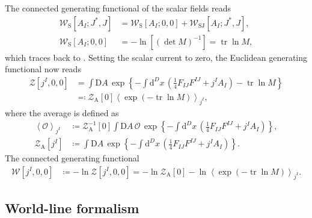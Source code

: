 \documentclass[12pt]{article}
\newcommand\dif{\mathrm{d}}
\newcommand\Dif{\mathrm{D}}
\DeclareMathOperator{\tr}{tr}
\newcommand{\rbr}[1]{{\left(#1\right)}}
\newcommand{\abr}[1]{{\left<#1\right>}}
\newcommand{\rfun}[2]{{#1}\mathopen{}\left(#2\right)\mathclose{}}
\newcommand{\sfun}[2]{{#1}\mathopen{}\left[#2\right]\mathclose{}}
\newcommand{\cfun}[2]{{#1}\mathopen{}\left\{#2\right\}\mathclose{}}
\begin{document}
The connected generating functional of the scalar fields reads
\begin{align}
\sfun{\mathcal{W}_{\text{S}}}{A_I; J^*, J} &= 
	\sfun{\mathcal{W}_{\text{S}}}{A_I; 0,0} +
	\sfun{\mathcal{W}_\text{SJ}}{A_I; J^*, J},
\\
\sfun{\mathcal{W}_{\text{S}}}{A_I; 0,0} &=
	-\sfun{\ln}{\rbr{\det M}^{-1}} = \tr\ln M,
\end{align}
which traces back to \cite{heisenberg1936,weisskopf1936}. Setting the scalar 
current to zero, the Euclidean generating functional now reads
\begin{align}
\sfun{\mathcal{Z}}{j^I, 0, 0} &=
\int\Dif A\, \cfun{\exp}{-\int \dif^D x\,
\rbr{\frac{1}{4} F_{IJ} F^{IJ} + j^{I} A_{I}} - \tr\ln M}
\nonumber \\
&\eqqcolon
\sfun{\mathcal{Z}_\text{A}}{0}
		\abr{\rfun{\exp}{-\tr\ln M}}_{j^I},
\label{eq:eucl-effe-100}
\end{align}
where the average is defined as
\begin{align}
\abr{\mathcal{O}}_{j^I} &\coloneqq \sfun{\mathcal{Z}_\text{A}^{-1}}{0}
\int\Dif A\, \mathcal{O}\,\cfun{\exp}{-\int \dif^D x\,
	\rbr{\frac{1}{4} F_{IJ} F^{IJ} + j^{I} A_{I}}},
\\
\sfun{\mathcal{Z}_\text{A}}{j^I} &\coloneqq
\int\Dif A\, \cfun{\exp}{-\int \dif^D x\,
\rbr{\frac{1}{4} F_{IJ} F^{IJ} + j^{I} A_{I}}}.
\end{align}
The connected generating functional
\begin{align}
\sfun{\mathcal{W}}{j^I, 0, 0} &\coloneqq -\ln \sfun{\mathcal{Z}}{j^I, 0, 0}
= -\ln \sfun{\mathcal{Z}_\text{A}}{0} - \ln \abr{\rfun{\exp}{-\tr\ln M}}_{j^I}.
\end{align}


\subsection{World-line formalism}
\label{ssec:eucl-wlfm}
\end{document}
